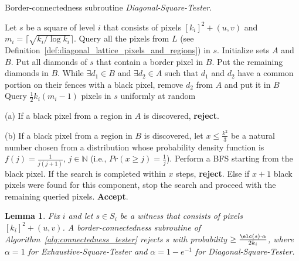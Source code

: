 \documentclass[11pt,english]{article}
\newtheorem{lemma}[theorem]{Lemma}
\numberwithin{figure}{section}
\newcommand{\Accept}{\textbf{Accept}\xspace}
\newcommand{\reject}{\textbf{reject}\xspace}
\begin{document}
\begin{algorithm}
\label{alg:diagonal_square_tester}
\caption{Border-connectedness subroutine \emph{Diagonal-Square-Tester}.}
\DontPrintSemicolon
\BlankLine
Let $s$ be a square of level $i$ that consists of pixels $[k_{i}]^{2}+(u,v)$ and
$m_{i}=\lceil\sqrt{k_{i}/\log k_{i}}\rceil$.\;
\nl Query all the pixels from $L$ (see
Definition~\ref{def:diagonal_lattice_pixels_and_regions}) in $s$.\;
\nl
Initialize sets $A$ and $B$. Put all diamonds of $s$ that contain
a border pixel in $B$. Put the remaining diamonds in $B$.
\;
\nl
While $\exists d_{1}\in B$ and $\exists d_{2}\in A$ such that $d_{1}$ and
$d_{2}$ have a common portion on their fences with a black pixel, remove $d_{2}$
from $A$ and put it in $B$\;
  \nl
Query $\frac{1}{2}k_{i}(m_{i}-1)$ pixels in $s$ uniformly at random

  (a) If a black pixel from a region in $A$ is discovered, \reject.

  (b) If a black pixel from a region in $B$ is discovered, let $x\leq \frac{k^{2}}{3}$ be a natural
  number chosen from a distribution whose probability
  density function is $f(j)=\frac{1}{j(j+1)}$, $j\in \mathbb{N}$ (i.e.,
  $Pr(x\geq j)=\frac{1}{j}$).
  Perform a BFS starting from the black pixel.
  If the search is completed within $x$ steps, \reject. Else if $x+1$ black pixels
  were found for this component, stop the search and proceed with the remaining
  queried pixels.
\;
\nl
\Accept.
\end{algorithm}
\begin{lemma}
\label{lm:success_probability}
Fix $i$ and let $s\in S_{i}$ be a witness that consists of pixels
$[k_{i}]^{2}+(u,v)$.
A border-connectedness subroutine of
Algorithm~\ref{alg:connectedness_tester} rejects $s$ with
probability $\geq \frac{\elc(s)\cdot\alpha}{2k_{i}}$, where $\alpha=1$ for \emph{Exhaustive-Square-Tester} and $\alpha=1-e^{-1}$ for \emph{Diagonal-Square-Tester}.
\end{lemma}
\end{document}
